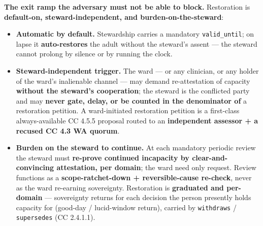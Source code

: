 \documentclass[11pt]{article}
\begin{document}
\textbf{The exit ramp the adversary must not be able to block.} Restoration is \textbf{default-on, steward-independent, and burden-on-the-steward}:


\begin{itemize}\setlength\itemsep{0pt}
\item \textbf{Automatic by default.} Stewardship carries a mandatory \texttt{valid\_until}; on lapse it \textbf{auto-restores} the adult without the steward's assent — the steward cannot prolong by silence or by running the clock.
\item \textbf{Steward-independent trigger.} The ward — or any clinician, or any holder of the ward's inalienable channel — may demand re-attestation of capacity \textbf{without the steward's cooperation}; the steward is the conflicted party and may \textbf{never gate, delay, or be counted in the denominator of} a restoration petition. A ward-initiated restoration petition is a first-class always-available CC 4.5.5 proposal routed to an \textbf{independent assessor + a recused CC 4.3 WA quorum}.
\item \textbf{Burden on the steward to continue.} At each mandatory periodic review the steward must \textbf{re-prove continued incapacity by clear-and-convincing attestation, per domain}; the ward need only request. Review functions as a \textbf{scope-ratchet-down + reversible-cause re-check}, never as the ward re-earning sovereignty. Restoration is \textbf{graduated and per-domain} — sovereignty returns for each decision the person presently holds capacity for (good-day / lucid-window return), carried by \texttt{withdraws} / \texttt{supersedes} (CC 2.4.1.1).
\end{itemize}
\end{document}
